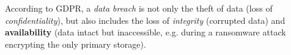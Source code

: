 \begin{warningbox}
According to GDPR, a \textit{data breach} is not only the theft of data (loss of \textit{confidentiality}), but also includes the loss of \textit{integrity} (corrupted data) and \textbf{availability} (data intact but inaccessible, e.g. during a ransomware attack encrypting the only primary storage).
\end{warningbox}
